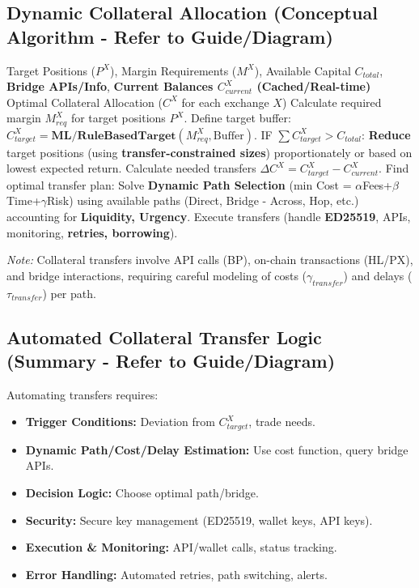 \documentclass{article}
\begin{document}
\subsection{Dynamic Collateral Allocation (Conceptual Algorithm - Refer to Guide/Diagram)}

\begin{algorithm}
\caption{Dynamic Collateral Allocation (Conceptual - Refer to Guide/Diagram)}
\begin{algorithmic}[1]
\REQUIRE Target Positions ($P^X$), Margin Requirements ($M^X$), Available Capital $C_{total}$, \textbf{Bridge APIs/Info}, \textbf{Current Balances $C_{current}^X$ (Cached/Real-time)}
\ENSURE Optimal Collateral Allocation ($C^X$ for each exchange $X$)
\STATE Calculate required margin $M_{req}^X$ for target positions $P^X$.
\STATE Define target buffer: $C_{target}^X = \textbf{ML/RuleBasedTarget}(M_{req}^X, \text{Buffer})$.
\STATE IF $\sum C_{target}^X > C_{total}$: \textbf{Reduce} target positions (using \textbf{transfer-constrained sizes}) proportionately or based on lowest expected return.
\STATE Calculate needed transfers $\Delta C^X = C_{target}^X - C_{current}^X$.
\STATE Find optimal transfer plan: Solve \textbf{Dynamic Path Selection} (min Cost = $\alpha$Fees+$\beta$Time+$\gamma$Risk) using available paths (Direct, Bridge - Across, Hop, etc.) accounting for \textbf{Liquidity, Urgency}.
\STATE Execute transfers (handle \textbf{ED25519}, APIs, monitoring, \textbf{retries, borrowing}).
\end{algorithmic}
\end{algorithm}
\textit{Note:} Collateral transfers involve API calls (BP), on-chain transactions (HL/PX), and bridge interactions, requiring careful modeling of costs ($\gamma_{transfer}$) and delays ($\tau_{transfer}$) per path.

\subsection{Automated Collateral Transfer Logic (Summary - Refer to Guide/Diagram)}
Automating transfers requires:
\begin{itemize}
    \item \textbf{Trigger Conditions:} Deviation from $C_{target}^X$, trade needs.
    \item \textbf{Dynamic Path/Cost/Delay Estimation:} Use cost function, query bridge APIs.
    \item \textbf{Decision Logic:} Choose optimal path/bridge.
    \item \textbf{Security:} Secure key management (ED25519, wallet keys, API keys).
    \item \textbf{Execution & Monitoring:} API/wallet calls, status tracking.
    \item \textbf{Error Handling:} Automated retries, path switching, alerts.
\end{itemize}
\end{document}
